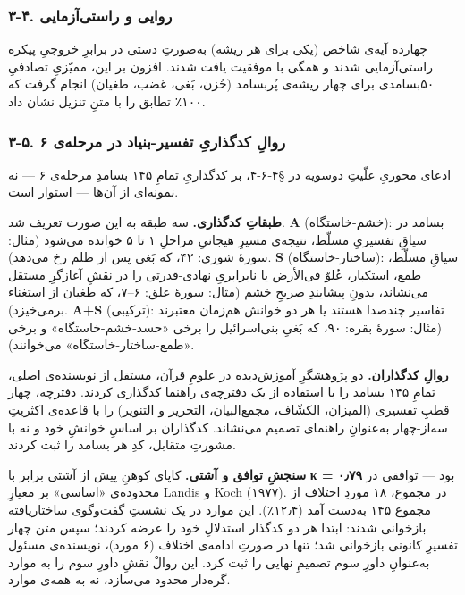 \begin{RTL}
\begin{otherlanguage}{persian}
\subsubsection{۳-۴. روایی و
راستی‌آزمایی}\label{ux631ux648ux627ux6ccux6cc-ux648-ux631ux627ux633ux62aux6ccux622ux632ux645ux627ux6ccux6cc}

چهارده آیه‌ی شاخص (یکی برای هر ریشه) به‌صورتِ دستی در برابرِ خروجیِ پیکره
راستی‌آزمایی شدند و همگی با موفقیت یافت شدند. افزون بر این، ممیّزیِ تصادفیِ
۵۰‌بسامدی برای چهار ریشه‌ی پُربسامد (حُزن، بَغی، غضب، طغیان) انجام گرفت که
۱۰۰٪ تطابق را با متنِ تنزیل نشان داد.

\subsubsection{۳-۵. روالِ کدگذاریِ تفسیر-بنیاد در مرحله‌ی
۶}\label{ux631ux648ux627ux644-ux6a9ux62fux6afux630ux627ux631ux6cc-ux62aux641ux633ux6ccux631-ux628ux646ux6ccux627ux62f-ux62fux631-ux645ux631ux62dux644ux647ux6cc-ux6f6}

ادعای محوریِ علّیتِ دوسویه در §۴-۶-۴، بر کدگذاریِ تمامِ ۱۴۵ بسامدِ مرحله‌ی ۶
--- نه نمونه‌ای از آن‌ها --- استوار است.

\textbf{طبقاتِ کدگذاری.} سه طبقه به این صورت تعریف شد. \textbf{A}
(خشم-خاستگاه): بسامد در سیاقِ تفسیریِ مسلّط، نتیجه‌ی مسیرِ هیجانیِ مراحلِ ۱ تا
۵ خوانده می‌شود (مثال: سورۀ شوری: ۴۲، که بَغی پس از ظلم رخ می‌دهد).
\textbf{S} (ساختار-خاستگاه): سیاقِ مسلّط، طمع، استکبار، عُلوّ فی‌الأرض یا
نابرابریِ نهادی-قدرتی را در نقشِ آغازگرِ مستقل می‌نشاند، بدونِ پیشایندِ صریحِ
خشم (مثال: سورۀ علق: ۶--۷، که طغیان از استغناء برمی‌خیزد). \textbf{A+S}
(ترکیبی): تفاسیر چندصدا هستند یا هر دو خوانش هم‌زمان معتبرند (مثال: سورۀ
بقره: ۹۰، که بَغیِ بنی‌اسرائیل را برخی «حسد-خشم-خاستگاه» و برخی
«طمع-ساختار-خاستگاه» می‌خوانند).

\textbf{روالِ کدگذاران.} دو پژوهشگرِ آموزش‌دیده در علومِ قرآن، مستقل از
نویسنده‌ی اصلی، تمامِ ۱۴۵ بسامد را با استفاده از یک دفترچه‌ی راهنما کدگذاری
کردند. دفترچه، چهار قطبِ تفسیری (المیزان، الکشّاف، مجمع‌البیان، التحریر و
التنویر) را با قاعده‌ی اکثریتِ سه‌از-چهار به‌عنوانِ راهنمای تصمیم می‌نشاند.
کدگذاران بر اساسِ خوانشِ خود و نه با مشورتِ متقابل، کدِ هر بسامد را ثبت
کردند.

\textbf{سنجشِ توافق و آشتی.} کاپای کوهنِ پیش از آشتی برابر با \textbf{κ =
۰٫۷۹} بود --- توافقی در محدوده‌ی «اساسی» بر معیارِ Landis و Koch (۱۹۷۷).
در مجموع، ۱۸ موردِ اختلاف از مجموع ۱۴۵ به‌دست آمد (۱۲٫۴٪). این موارد در یک
نشستِ گفت‌وگوی ساختاریافته بازخوانی شدند: ابتدا هر دو کدگذار استدلالِ خود
را عرضه کردند؛ سپس متن چهار تفسیرِ کانونی بازخوانی شد؛ تنها در صورتِ
ادامه‌ی اختلاف (۶ مورد)، نویسنده‌ی مسئول به‌عنوانِ داورِ سوم تصمیمِ نهایی را
ثبت کرد. این روالْ نقشِ داورِ سوم را به موارد گره‌دار محدود می‌سازد، نه به
همه‌ی موارد.


\end{otherlanguage}
\end{RTL}
